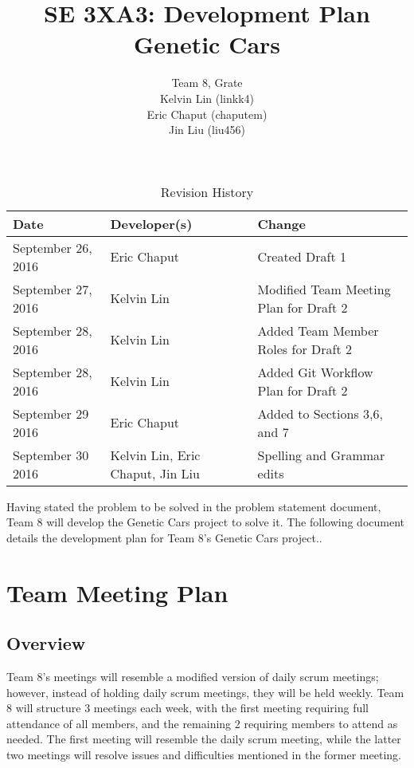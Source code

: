 \documentclass{article}
\title{SE 3XA3: Development Plan\\Genetic Cars}
\author{Team 8, Grate
		\\ Kelvin Lin (linkk4)
		\\ Eric Chaput (chaputem)
		\\ Jin Liu (liu456)
}
\date{}
\begin{document}
\begin{table}[hp]
\caption{Revision History} \label{TblRevisionHistory}
\begin{tabularx}{\textwidth}{llX}
\toprule
\textbf{Date} & \textbf{Developer(s)} & \textbf{Change}\\
\midrule
September 26, 2016 & Eric Chaput & Created Draft 1\\
September 27, 2016 & Kelvin Lin & Modified Team Meeting Plan for Draft 2\\
September 28, 2016 & Kelvin Lin & Added Team Member Roles for Draft 2\\
September 28, 2016 & Kelvin Lin & Added Git Workflow Plan for Draft 2\\
September 29 2016 & Eric Chaput & Added to Sections 3,6, and 7\\
September 30 2016 & Kelvin Lin, Eric Chaput, Jin Liu & Spelling and Grammar edits\\
\bottomrule
\end{tabularx}
\end{table}

\newpage

\maketitle

Having stated the problem to be solved in the problem statement document, Team 8 
will develop the Genetic Cars project to solve it. The following document 
details the development plan for Team 8's Genetic Cars project..

\section{Team Meeting Plan}

\subsection{Overview}
Team 8's meetings will resemble a modified version of daily scrum meetings; 
however, instead of holding daily scrum meetings, they will be held weekly. Team 
8 will structure 3 meetings each week, with the first meeting requiring full 
attendance of all members, and the remaining 2 requiring members to attend as 
needed. The first meeting will resemble the daily scrum meeting, while the 
latter two meetings will resolve issues and difficulties mentioned in the former 
meeting.
\end{document}

